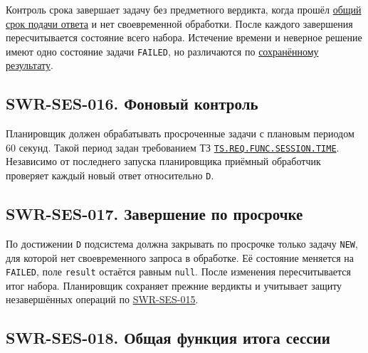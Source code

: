 \documentclass[12pt,a4paper]{article}
\begin{document}
\hypertarget{4-контроль-срока-и-итог}{}

Контроль срока завершает задачу без предметного вердикта, когда прошёл {\hyperlink{время-решения-и-время-обработки}{общий срок подачи ответа}} и нет своевременной обработки. После каждого завершения пересчитывается состояние всего набора. Истечение времени и неверное решение имеют одно состояние задачи \texttt{FAILED}, но различаются по {\hyperlink{чтение-после-потери-ответа}{сохранённому результату}}.

\subsection{SWR-SES-016. Фоновый контроль}\label{swr-ses-016-ux444ux43eux43dux43eux432ux44bux439-ux43aux43eux43dux442ux440ux43eux43bux44c}

\hypertarget{swr-ses-016-фоновый-контроль}{}

\hypertarget{swr-ses-016}{}

Планировщик должен обрабатывать просроченные задачи с плановым периодом 60 секунд. Такой период задан требованием ТЗ {\href{../02\_Техническое\_задание/Техническое\_задание.pdf\#ts-req-func-session-time}{\texttt{TS.\allowbreak{}REQ.\allowbreak{}FUNC.\allowbreak{}SESSION.\allowbreak{}TIME}}}. Независимо от последнего запуска планировщика приёмный обработчик проверяет каждый новый ответ относительно \texttt{D}.

\subsection{SWR-SES-017. Завершение по просрочке}\label{swr-ses-017-ux437ux430ux432ux435ux440ux448ux435ux43dux438ux435-ux43fux43e-ux43fux440ux43eux441ux440ux43eux447ux43aux435}

\hypertarget{swr-ses-017-завершение-по-просрочке}{}

\hypertarget{swr-ses-017}{}

По достижении \texttt{D} подсистема должна закрывать по просрочке только задачу \texttt{NEW}, для которой нет своевременного запроса в обработке. Её состояние меняется на \texttt{FAILED}, поле \texttt{result} остаётся равным \texttt{null}. После изменения пересчитывается итог набора. Планировщик сохраняет прежние вердикты и учитывает защиту незавершённых операций по {\hyperlink{swr-ses-015}{SWR-SES-015}}.

\subsection{SWR-SES-018. Общая функция итога сессии}\label{swr-ses-018-ux43eux431ux449ux430ux44f-ux444ux443ux43dux43aux446ux438ux44f-ux438ux442ux43eux433ux430-ux441ux435ux441ux441ux438ux438}
\end{document}
